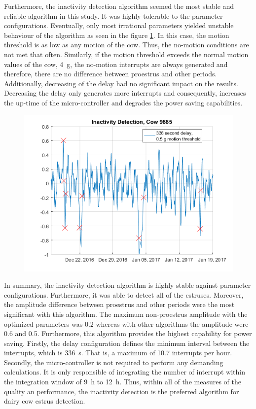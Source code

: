\documentclass[english,12pt,a4paper,pdftex,elec,utf8]{aaltothesis}
\begin{document}
Furthermore, the inactivity detection algorithm seemed the most stable and reliable algorithm in this study. It was highly tolerable to the parameter configurations. Eventually, only most irrational parameters yielded unstable behaviour of the algorithm as seen in the figure \ref{InactivityDetectionCow9885_336period05threshold}. In this case, the motion threshold is as low as any motion of the cow. Thus, the no-motion conditions are not met that often. Similarly, if the motion threshold exceeds the normal motion values of the cow, \SI{4}{\gram}, the no-motion interrupts are always generated and therefore, there are no difference between proestrus and other periods. Additionally, decreasing of the delay had no significant impact on the results. Decreasing the delay only generates more interrupts and consequently, increases the up-time of the micro-controller and degrades the power saving capabilities. 

\begin{figure}[htb]
\centering
\includegraphics[width = 0.75 \textwidth]{figures/InactivityDetectionCow9885_336period05threshold.png}
\caption{}
\label{InactivityDetectionCow9885_336period05threshold}
\end{figure}

In summary, the inactivity detection algorithm is highly stable against parameter configurations. Furthermore, it was able to detect all of the estruses. Moreover, the amplitude difference between proestrus and other periods were the most significant with this algorithm. The maximum non-proestrus amplitude with the optimized parameters was 0.2 whereas with other algorithms the amplitude were 0.6 and 0.5. Furthermore, this algorithm provides the highest capability for power saving. Firstly, the delay configuration defines the minimum interval between the interrupts, which is \SI{336}{\second}. That is, a maximum of 10.7 interrupts per hour. Secondly, the micro-controller is not required to perform any demanding calculations. It is only responsible of integrating the number of interrupt within the integration window of \SI{9}{\hour} to \SI{12}{\hour}. Thus, within all of the measures of the quality an performance, the inactivity detection is the preferred algorithm for dairy cow estrus detection.
\end{document}
